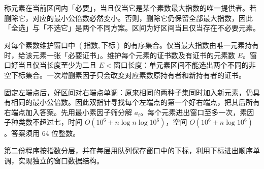 \Legend
称元素在当前区间内「必要」，当且仅当它是某个素数最大指数的唯一提供者。若删除它，对应的最小公倍数必然变小。否则，删除它仍保留全部最大指数，因此「全选」与「不选它」是两个不同方案。区间为好区间当且仅当存在不必要元素。

对每个素数维护窗口中 $(指数,下标)$ 的有序集合。仅当最大指数由唯一元素持有时，给该元素一张「必要证书」。维护每个元素的证书数及有证书的元素数 $E$。窗口好当且仅当长度至少为二且 $E<窗口长度$：单元素区间不能选出两个不同的非空下标集合。一次增删素因子只会改变对应素数原持有者和新持有者的证书。

固定左端点后，好区间对右端点单调：原来相同的两种子集同时加入新元素，仍具有相同的最小公倍数。因此双指针寻找每个左端点的第一个好右端点，把其后所有右端点加入答案。先用最小素因子筛分解 $a_i$。每个元素进出窗口至多一次，素因子种类数不超过七，时间 $O(10^6+n\log n\log 10^6)$，空间 $O(10^6+n\log 10^6)$。答案须用 64 位整数。

第二份程序按指数分层，并在每层用队列保存窗口中的下标，利用下标进出顺序单调，实现独立的窗口数据结构。
